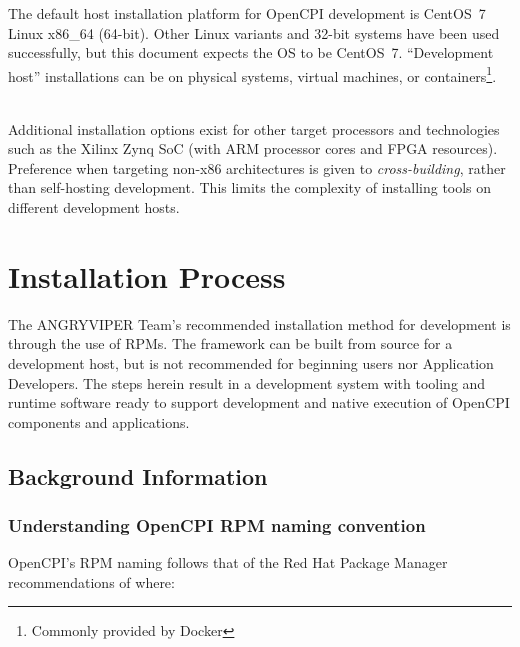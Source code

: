 The default host installation platform for OpenCPI development is %
CentOS~7 Linux x86\_64 (64-bit). Other Linux variants and 32-bit systems have been used successfully, but this document expects the OS to be CentOS~7.
``Development host'' installations can be on physical systems, virtual machines, or containers\footnote{Commonly provided by Docker}.\\
\begin{center}
\end{center}
~\\ %
Additional installation options exist for other target processors and technologies such as the Xilinx Zynq SoC (with ARM processor cores and FPGA resources). Preference when targeting non-x86 architectures is given to \textit{cross-building}, rather than self-hosting development. This limits the complexity of installing tools on different development hosts.

\section{Installation Process}
\label{sec:install_opencpi}
The ANGRYVIPER Team's recommended installation method for development is through the use of RPMs.
The framework can be built from source for a development host, but is not recommended for beginning users nor Application Developers.
The steps herein result in a development system with tooling and runtime software ready to support development and native execution of OpenCPI components and applications.


\subsection{Background Information}
\subsubsection*{Understanding OpenCPI RPM naming convention}
\label{sec:understand_rpm_naming}
OpenCPI's RPM naming follows that of the Red Hat Package Manager recommendations of  where:

